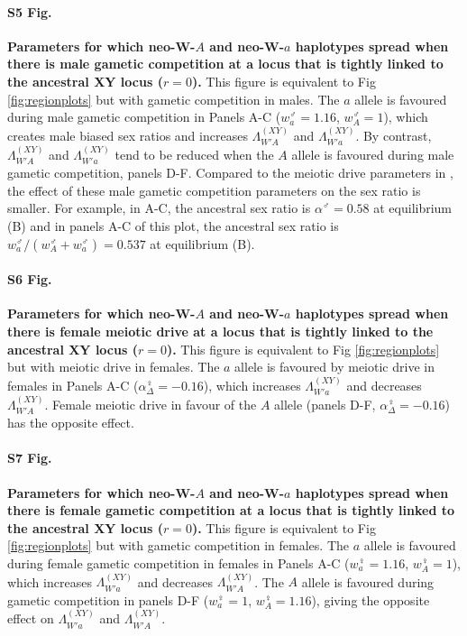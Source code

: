 \documentclass[10pt,letterpaper]{article}
\begin{document}
\paragraph*{S5 Fig.}
\label{fig:regionMaleGS}
{\bf Parameters for which neo-W-$A$ and neo-W-$a$ haplotypes spread when there is male gametic competition at a locus that is tightly linked to the ancestral XY locus ($r=0$).}
This figure is equivalent to Fig \ref{fig:regionplots} but with gametic competition in males.
The $a$ allele is favoured during male gametic competition in Panels A-C ($w_{a}^\male=1.16$, $w_{A}^\male=1$), which creates male biased sex ratios and increases $\Lambda_{W'A}^{(XY)}$ and $\Lambda_{W'a}^{(XY)}$. 
By contrast, $\Lambda_{W'A}^{(XY)}$ and $\Lambda_{W'a}^{(XY)}$ tend to be reduced when the $A$ allele is favoured during male gametic competition, panels D-F.
Compared to the meiotic drive parameters in , the effect of these male gametic competition parameters on the sex ratio is smaller. 
For example, in A-C, the ancestral sex ratio is $\alpha^\male=0.58$ at equilibrium (B) and in panels A-C of this plot, the ancestral sex ratio is $w_{a}^\male/(w_{A}^\male+w_{a}^\male)=0.537$ at equilibrium (B). 

\paragraph*{S6 Fig.}
\label{fig:regionFemaleDrive}
{\bf Parameters for which neo-W-$A$ and neo-W-$a$ haplotypes spread when there is female meiotic drive at a locus that is tightly linked to the ancestral XY locus ($r=0$).}
This figure is equivalent to Fig \ref{fig:regionplots} but with meiotic drive in females.
The $a$ allele is favoured by meiotic drive in females in Panels A-C ($\alpha_{\Delta}^\female=-0.16$), which increases $\Lambda_{W'a}^{(XY)}$ and decreases $\Lambda_{W'A}^{(XY)}$. 
Female meiotic drive in favour of the $A$ allele (panels D-F, $\alpha_{\Delta}^\female=-0.16$) has the opposite effect. 

\paragraph*{S7 Fig.}
\label{fig:regionFemaleGS}
{\bf Parameters for which neo-W-$A$ and neo-W-$a$ haplotypes spread when there is female gametic competition at a locus that is tightly linked to the ancestral XY locus ($r=0$).}
This figure is equivalent to Fig \ref{fig:regionplots} but with gametic competition in females.
The $a$ allele is favoured during female gametic competition in females in Panels A-C ($w_{a}^\female=1.16$, $w_{A}^\female=1$), which increases $\Lambda_{W'a}^{(XY)}$ and decreases $\Lambda_{W'A}^{(XY)}$. 
The $A$ allele is favoured during gametic competition in panels D-F ($w_{a}^\female=1$, $w_{A}^\female=1.16$), giving the opposite effect on $\Lambda_{W'a}^{(XY)}$ and $\Lambda_{W'A}^{(XY)}$. 
\end{document}
